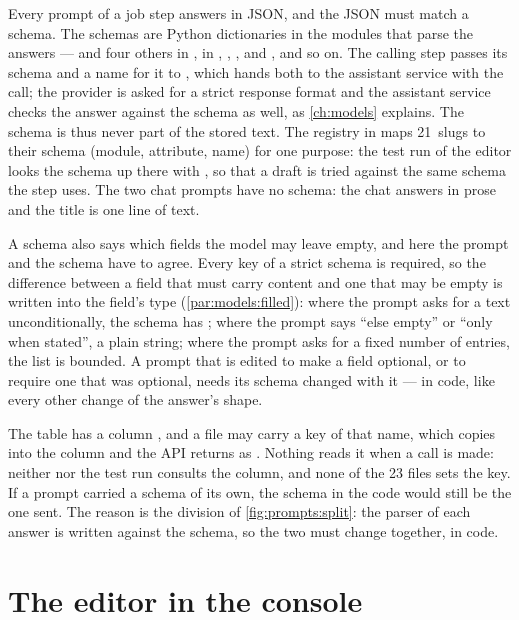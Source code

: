 Every prompt of a job step answers in JSON, and the JSON must match a schema. The schemas are
Python dictionaries in the modules that parse the answers —  and four others
in ,  in ,
, ,  and
, and so on. The calling step passes its schema and a name for it
to , which hands both to the assistant service
with the call; the provider is asked for a strict response format and the assistant service
checks the answer against the schema as well, as \cref{ch:models} explains. The
schema is thus never part of the stored text. The registry  in
 maps 21~slugs to their schema (module, attribute, name) for one
purpose: the test run of the editor looks the schema up there with , so that a
draft is tried against the same schema the step uses. The two chat prompts have no schema: the
chat answers in prose and the title is one line of text.

A schema also says which fields the model may leave empty, and here the prompt and the schema
have to agree. Every key of a strict schema is required, so the difference between a field
that must carry content and one that may be empty is written into the field's type
(\cref{par:models:filled}): where the prompt asks for a text unconditionally, the schema has
; where the prompt says \enquote{else empty} or \enquote{only when stated}, a
plain string; where the prompt asks for a fixed number of entries, the list is bounded. A
prompt that is edited to make a field optional, or to require one that was optional, needs
its schema changed with it --- in code, like every other change of the answer's shape.

The  table has a column , and a file may carry a key of that
name, which  copies into the column and the API returns as
. Nothing reads it when a call is made: neither  nor the
test run consults the column, and none of the 23 files sets the key. If a prompt carried a
schema of its own, the schema in the code would still be the one sent. The reason is the
division of \cref{fig:prompts:split}: the parser of each answer is written against the schema,
so the two must change together, in code.


\section{The editor in the console}\label{sec:prompts:editor}

